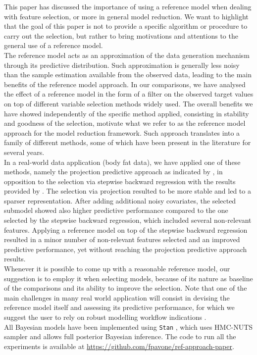 \documentclass[american,]{article}
\theoremstyle{definition}
\begin{document}
This paper has discussed the importance of using a reference model when dealing with feature selection, or more in general model reduction. We want to highlight that the goal of this paper is not to provide a specific algorithm or procedure to carry out the selection, but rather to bring motivations and attentions to the general use of a reference model. 
\\
The reference model acts as an approximation of the data generation mechanism through its predictive distribution. Such approximation is generally less noisy than the sample estimation available from the observed data, leading to the main benefits of the reference model approach. In our comparisons, we have analysed the effect of a reference model in the form of a filter on the observed target values on top of different variable selection methods widely used. The overall benefits we have showed independently of the specific method applied, consisting in stability and goodness of the selection, motivate what we refer to as the reference model approach for the model reduction framework. Such approach translates into a family of different methods, some of which have been present in the literature for several years.
\\
In a real-world data application (body fat data), we have applied one of these methods, namely the projection predictive approach as indicated by \cite{paper:projpred}, in opposition to the selection via stepwise backward regression with the results provided by \cite{paper:bodyfat}. The selection via projection resulted to be more stable and led to a sparser representation. After adding additional noisy covariates, the selected submodel showed also higher predictive performance compared to the one selected by the stepwise backward regression, which included several non-relevant features. Applying a reference model on top of the stepwise backward regression resulted in a minor number of non-relevant features selected and an improved predictive performance, yet without reaching the projection predictive approach results.
\\
Whenever it is possible to come up with a reasonable reference model, our suggestion is to employ it when selecting models, because of its nature as baseline of the comparisons and its ability to improve the selection. Note that one of the main challenges in many real world application will consist in devising the reference model itself and assessing its predictive performance, for which we suggest the user to rely on robust modelling workflow indications \cite[see e.g.][]{gabry2019visualization}.
\\
All Bayesian models have been implemented using \texttt{Stan} \citep{paper:stan}, which uses HMC-NUTS sampler \citep{hoffman2014no} and allows full posterior Bayesian inference. The code to run all the experiments is available at \url{https://github.com/fpavone/ref-approach-paper}. 
\end{document}
